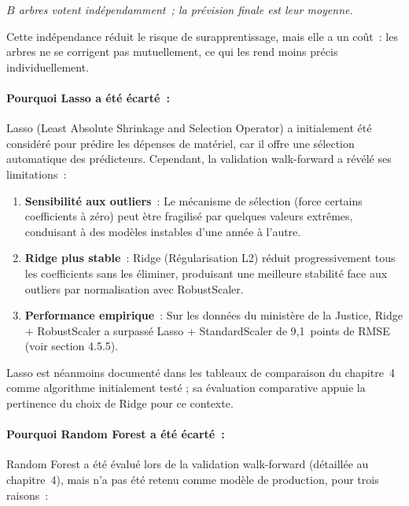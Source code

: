 \noindent\small\textit{$B$ arbres votent ind\'ependamment~; la pr\'evision finale est leur moyenne.}\normalsize

Cette indépendance réduit le risque de surapprentissage, mais elle a un coût~: les
arbres ne se corrigent pas mutuellement, ce qui les rend moins précis individuellement.

\paragraph{Pourquoi Lasso a été écarté~:}

Lasso (Least Absolute Shrinkage and Selection Operator) a initialement été considéré
pour prédire les dépenses de matériel, car il offre une sélection automatique des
prédicteurs. Cependant, la validation walk-forward a révélé ses limitations~:

\begin{enumerate}
    \item \textbf{Sensibilité aux outliers}~: Le mécanisme de sélection (force
    certains coefficients à zéro) peut ètre fragilisé par quelques valeurs extrêmes,
    conduisant à des modèles instables d'une année à l'autre.
    \item \textbf{Ridge plus stable}~: Ridge (Régularisation L2) réduit progressivement
    tous les coefficients sans les éliminer, produisant une meilleure stabilité
    face aux outliers par normalisation avec RobustScaler.
    \item \textbf{Performance empirique}~: Sur les données du ministère de la Justice,
    Ridge + RobustScaler a surpassé Lasso + StandardScaler de 9,1~points de RMSE
    (voir section 4.5.5).
\end{enumerate}

Lasso est néanmoins documenté dans les tableaux de comparaison du chapitre~4 comme
algorithme initialement testé ; sa évaluation comparative appuie la pertinence du
choix de Ridge pour ce contexte.

\paragraph{Pourquoi Random Forest a été écarté~:}

Random Forest a été évalué lors de la validation walk-forward (détaillée au
chapitre~4), mais n'a pas été retenu comme modèle de production, pour trois raisons~:


